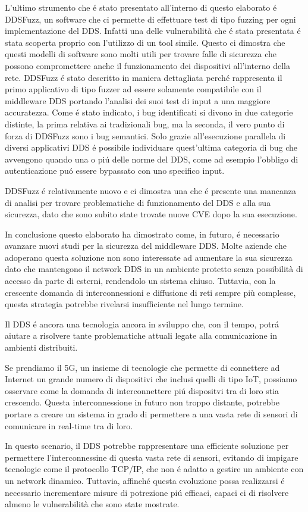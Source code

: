 L'ultimo strumento che é stato presentato all'interno di questo 
elaborato é DDSFuzz, un software che ci permette di effettuare test 
di tipo fuzzing per ogni implementazione del DDS. Infatti una delle 
vulnerabilità che é stata presentata é stata scoperta proprio 
con l'utilizzo di un tool simile. Questo ci dimostra che questi 
modelli di software sono molti utili per trovare falle di sicurezza 
che possono compromettere anche il funzionamento dei dispositivi
all'interno della rete. DDSFuzz é stato descritto in maniera dettagliata
perché rappresenta il primo applicativo di tipo fuzzer ad essere
solamente  
compatibile con il middleware DDS portando l'analisi dei suoi test di 
input a una maggiore accuratezza. Come é stato indicato, i bug identificati
si divono in due categorie distinte, la prima relativa ai tradizionali 
bug, ma la seconda, il vero punto di forza di DDSFuzz sono i bug semantici.
Solo grazie all'esecuzione parallela di diversi applicativi DDS é possibile
individuare quest'ultima categoria di bug che avvengono quando 
una o piú delle norme del DDS, come ad esempio l'obbligo di 
autenticazione puó essere bypassato con uno specifico input.

DDSFuzz é relativamente nuovo e ci dimostra una che é presente 
una mancanza di analisi per trovare problematiche di funzionamento
del DDS e alla sua sicurezza, dato che sono subito state trovate 
nuove CVE dopo la sua esecuzione. 

In conclusione questo elaborato ha dimostrato come, in futuro,
é necessario avanzare nuovi studi per la sicurezza del 
middleware DDS. Molte aziende che adoperano questa soluzione 
non sono interessate ad aumentare la sua sicurezza dato che 
mantengono il network DDS in un ambiente 
protetto senza possibilità di accesso da parte di esterni, 
rendendolo un sistema chiuso. 
Tuttavia, con la crescente domanda di interconnessioni
e diffusione di reti sempre più complesse, 
questa strategia potrebbe rivelarsi insufficiente nel lungo termine.

Il DDS é ancora una tecnologia ancora in 
sviluppo che, con il tempo, potrá aiutare a risolvere tante 
problematiche attuali legate alla comunicazione in 
ambienti distribuiti. 

Se prendiamo il 5G, un insieme di tecnologie che permette 
di connettere ad Internet un grande numero di dispositivi che 
inclusi quelli di tipo IoT, 
possiamo osservare come la domanda di interconnettere piú dispositvi 
tra di loro stia crescendo. Questa interconnessione in futuro 
non troppo distante, potrebbe portare a creare un sistema in 
grado di permettere a una vasta rete di 
sensori di comunicare in real-time 
tra di loro.

In questo scenario, il DDS potrebbe rappresentare una efficiente
soluzione per permettere l'interconnessine di questa vasta 
rete di sensori, evitando di impigare tecnologie come il 
protocollo TCP/IP, che non é adatto a gestire un ambiente con 
un network dinamico. Tuttavia, affinché questa evoluzione possa 
realizzarsi é necessario incrementare misure di potrezione 
piú efficaci, capaci ci di risolvere almeno le vulnerabilità che 
sono state mostrate.


